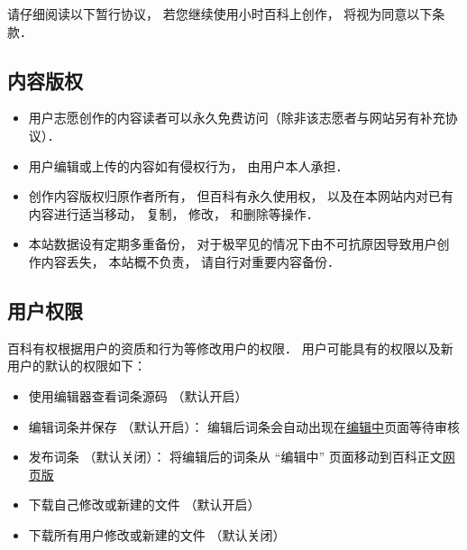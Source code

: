 
请仔细阅读以下暂行协议， 若您继续使用小时百科上创作， 将视为同意以下条款．

\subsection{内容版权}
\begin{itemize}
\item 用户志愿创作的内容读者可以永久免费访问（除非该志愿者与网站另有补充协议）．
\item 用户编辑或上传的内容如有侵权行为， 由用户本人承担．
\item 创作内容版权归原作者所有， 但百科有永久使用权， 以及在本网站内对已有内容进行适当移动， 复制， 修改， 和删除等操作．
\item 本站数据设有定期多重备份， 对于极罕见的情况下由不可抗原因导致用户创作内容丢失， 本站概不负责， 请自行对重要内容备份．
\end{itemize}

\subsection{用户权限}
百科有权根据用户的资质和行为等修改用户的权限． 用户可能具有的权限以及新用户的默认的权限如下：
\begin{itemize}
\item 使用编辑器查看词条源码 （默认开启）
\item 编辑词条并保存 （默认开启）： 编辑后词条会自动出现在\href{http://wuli.wiki/changed}{编辑中}页面等待审核
\item 发布词条 （默认关闭）： 将编辑后的词条从 “编辑中” 页面移动到百科正文\href{http://wuli.wiki/online}{网页版}
\item 下载自己修改或新建的文件 （默认开启）
\item 下载所有用户修改或新建的文件 （默认关闭）
\end{itemize}
